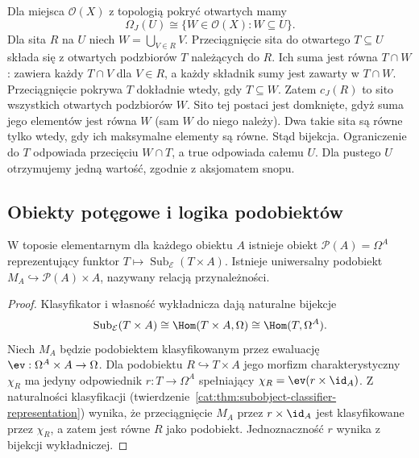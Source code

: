 \begin{przyklad}\label{cat:ex:topological-truth-values}
Dla miejsca $\mathcal O(X)$ z topologią pokryć otwartych mamy
\[
 \Omega_J(U)\cong\{W\in\mathcal O(X):W\subseteq U\}.
\]
Dla sita $R$ na $U$ niech $W=\bigcup_{V\in R}V$. Przeciągnięcie sita do otwartego $T\subseteq U$ składa się z otwartych podzbiorów $T$ należących do $R$. Ich suma jest równa $T\cap W$: zawiera każdy $T\cap V$ dla $V\in R$, a każdy składnik sumy jest zawarty w $T\cap W$. Przeciągnięcie pokrywa $T$ dokładnie wtedy, gdy $T\subseteq W$. Zatem $c_J(R)$ to sito wszystkich otwartych podzbiorów $W$. Sito tej postaci jest domknięte, gdyż suma jego elementów jest równa $W$ (sam $W$ do niego należy). Dwa takie sita są równe tylko wtedy, gdy ich maksymalne elementy są równe. Stąd bijekcja. Ograniczenie do $T$ odpowiada przecięciu $W\cap T$, a $\mathrm{true}$ odpowiada całemu $U$. Dla pustego $U$ otrzymujemy jedną wartość, zgodnie z aksjomatem snopu.
\end{przyklad}


\subsection{Obiekty potęgowe i logika podobiektów}

\begin{twierdzenie}\label{cat:thm:power-object}
W toposie elementarnym dla każdego obiektu $A$ istnieje obiekt $\mathcal P(A)=\Omega^A$ reprezentujący funktor $T\mapsto\operatorname{Sub}_{\mathcal E}(T\times A)$. Istnieje uniwersalny podobiekt $M_A\hookrightarrow\mathcal P(A)\times A$, nazywany relacją przynależności.
\end{twierdzenie}
\begin{proof}
Klasyfikator i własność wykładnicza dają naturalne bijekcje
\[
 \operatorname{Sub}_{\mathcal E}(T\times A)
 \cong\Hom(T\times A,\Omega)
 \cong\Hom(T,\Omega^A).
\]
Niech $M_A$ będzie podobiektem klasyfikowanym przez ewaluację $\ev:\Omega^A\times A\to\Omega$. Dla podobiektu $R\hookrightarrow T\times A$ jego morfizm charakterystyczny $\chi_R$ ma jedyny odpowiednik $r:T\to\Omega^A$ spełniający $\chi_R=\ev(r\times\id_A)$. Z naturalności klasyfikacji (twierdzenie~\ref{cat:thm:subobject-classifier-representation}) wynika, że przeciągnięcie $M_A$ przez $r\times\id_A$ jest klasyfikowane przez $\chi_R$, a zatem jest równe $R$ jako podobiekt. Jednoznaczność $r$ wynika z bijekcji wykładniczej.
\end{proof}

